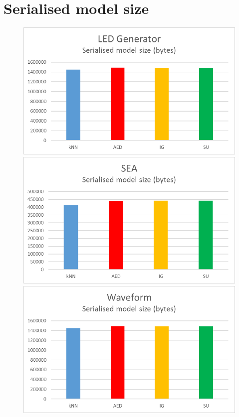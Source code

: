 \section{Serialised model size}
\begin{figure}[hp]
\centering
\includegraphics[scale=0.17]{Graphs/LED/10_bytes}
\includegraphics[scale=0.17]{Graphs/SEA/bytes}
\includegraphics[scale=0.17]{Graphs/Waveform/bytes}

\end{figure}
